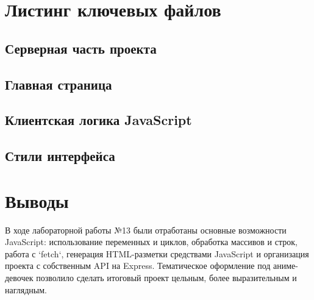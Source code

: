 \section{Листинг ключевых файлов}

\subsection{Серверная часть проекта}


\subsection{Главная страница}


\subsection{Клиентская логика JavaScript}


\subsection{Стили интерфейса}


\section{Выводы}

В ходе лабораторной работы №13 были отработаны основные возможности JavaScript: использование переменных и циклов, обработка массивов и строк, работа с `fetch`, генерация HTML-разметки средствами JavaScript и организация проекта с собственным API на Express. Тематическое оформление под аниме-девочек позволило сделать итоговый проект цельным, более выразительным и наглядным.
